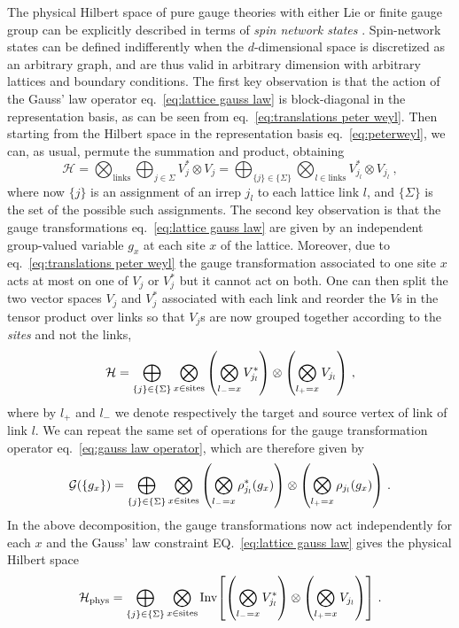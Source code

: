 The physical Hilbert space of pure gauge theories with either Lie or finite gauge group can be explicitly described in terms of \textit{spin network states} \cite{Baez, Burgio}.
Spin-network states can be defined indifferently when the $d$-dimensional space is discretized as an arbitrary graph, and are thus valid in arbitrary dimension with arbitrary lattices and boundary conditions.
The first key observation is that the action of the Gauss' law operator eq.~\eqref{eq:lattice gauss law} is block-diagonal in the representation basis, as can be seen from eq.~\eqref{eq:translations peter weyl}.
Then starting from the Hilbert space in the representation basis eq.~\eqref{eq:peterweyl}, we can, as usual, permute the summation and product, obtaining
\begin{equation}
    \label{eq:hilbert space permuted}
    \mathcal{H} = \bigotimes_{\mathrm{links}} \bigoplus_{j \in \Sigma} V_j^* \otimes V_j=\bigoplus_{\{j\} \in \{\Sigma\}} \bigotimes_{l \in \mathrm{links}}  V_{j_l}^* \otimes V_{j_l} \ ,
\end{equation}
where now $\{j\}$ is an assignment of an irrep $j_l$ to each lattice link $l$, and $\{\Sigma\}$ is the set of the possible such assignments.
The second key observation is that the gauge transformations eq.~\eqref{eq:lattice gauss law} are given by an independent group-valued variable $g_x$ at each site $x$ of the lattice.
Moreover, due to eq.~\eqref{eq:translations peter weyl} the gauge transformation associated to one site $x$ acts at most on one of $V_j$ or $V_j^*$ but it cannot act on both.
One can then split the two vector spaces $V_j$ and $V_j^*$ associated with each link and reorder the $V$s in the tensor product over links so that $V_j$s are now grouped together according to the \textit{sites} and not the links,
\begin{equation}
    \mathcal{H} = \bigoplus_{\{j\} \in \{\Sigma\}} \bigotimes_{x \in \mathrm{sites}} \pqty{\bigotimes_{l_-=x} V_{j_l}^*} \otimes \pqty{\bigotimes_{l_+=x} V_{j_l} }\ ,
\end{equation}
where by $l_+$ and $l_-$ we denote respectively the target and source vertex of link of link $l$.
We can repeat the same set of operations for the gauge transformation operator eq.~\eqref{eq:gauss law operator}, which are therefore given by
\begin{equation}
    \mathcal{G}(\{g_x\}) = \bigoplus_{\{j\} \in \{\Sigma\}} \bigotimes_{x \in \mathrm{sites}} \pqty{\bigotimes_{l_-=x} \rho_{j_l}^*(g_x)} \otimes \pqty{\bigotimes_{l_+=x} \rho_{j_l}(g_x) }\ .
\end{equation}
In the above decomposition, the gauge transformations now act independently for each $x$ and the Gauss' law constraint EQ.~\eqref{eq:lattice gauss law} gives the physical Hilbert space
\begin{equation}
    \label{eq:spin network Hilbert space}
    \mathcal{H}_{\mathrm{phys}} = \bigoplus_{\{j\} \in \{\Sigma\}} \bigotimes_{x \in \mathrm{sites}} \mathrm{Inv}\bqty{\pqty{\bigotimes_{l_-=x} V_{j_l}^*} \otimes \pqty{\bigotimes_{l_+=x} V_{j_l} }} \ .
\end{equation}


